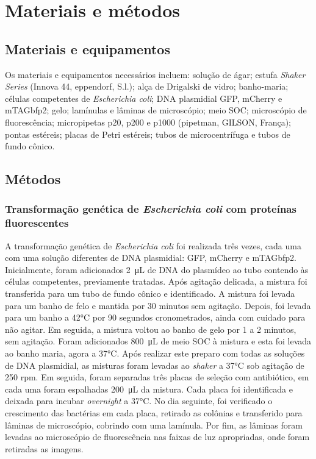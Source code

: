 \section{Materiais e métodos}
\subsection{Materiais e equipamentos}
Os materiais e equipamentos necessários incluem: solução de ágar; estufa
\textit{Shaker Series} (Innova 44, eppendorf, S.l.); alça de Drigalski de vidro;
banho-maria; células competentes de \textit{Escherichia coli}; DNA plasmidial
GFP, mCherry e mTAGbfp2; gelo; lamínulas e lâminas de microscópio; meio SOC;
microscópio de fluorescência; micropipetas p20, p200 e p1000 (pipetman, GILSON,
França); pontas estéreis; placas de Petri estéreis; tubos de microcentrífuga e
tubos de fundo cônico.

\subsection{Métodos}
\subsubsection{Transformação genética de \textit{Escherichia coli} com proteínas
fluorescentes}
A transformação genética de \textit{Escherichia coli} foi realizada três vezes,
cada uma com uma solução diferentes de DNA plasmidial: GFP, mCherry e
mTAGbfp2. Inicialmente, foram adicionados \qty{2}{\micro\liter} de DNA do
plasmídeo ao tubo contendo às células competentes, previamente tratadas. Após
agitação delicada, a mistura foi transferida para um tubo de fundo cônico e
identificado. A mistura foi levada para um banho de felo e mantida por 30
minutos sem agitação. Depois, foi levada para um banho a 42°C por 90 segundos
cronometrados, ainda com cuidado para não agitar. Em seguida, a mistura voltou
ao banho de gelo por 1 a 2 minutos, sem agitação. Foram adicionados
\qty{800}{\micro\liter} de meio SOC à mistura e esta foi levada ao banho maria,
agora a 37°C. Após realizar este preparo com todas as soluções de DNA
plasmidial, as misturas foram levadas ao \textit{shaker} a 37°C sob agitação de
250 rpm. Em seguida, foram separadas três placas de seleção com antibiótico, em
cada uma foram espalhadas \qty{200}{\micro\liter} da mistura. Cada placa foi
identificada e deixada para incubar \textit{overnight} a 37°C. No dia seguinte, foi
verificado o crescimento das bactérias em cada placa, retirado as colônias e
transferido para lâminas de microscópio, cobrindo com uma lamínula. Por fim, as
lâminas foram levadas ao microscópio de fluorescência nas faixas de luz
apropriadas, onde foram retiradas as imagens.
